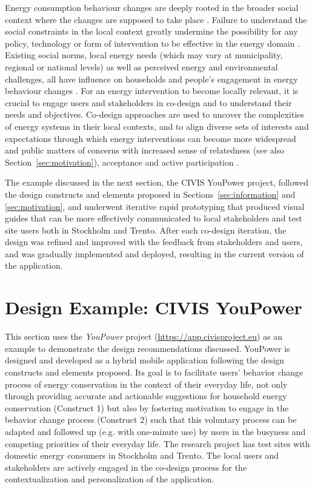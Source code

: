 \documentclass[a4paper,10pt]{article}
\begin{document}
Energy consumption behaviour changes are deeply rooted in the broader social context where the changes are supposed to take place \citep{Owens2008}. Failure to understand the social constraints in the local context greatly undermine the possibility for any policy, technology or form of intervention to be effective in the energy domain \citep{Devine-Wright2005}. Existing social norms, local energy needs (which may vary at municipality, regional or national levels) as well as perceived energy and environmental challenges, all have influence on households and people's engagement in energy behaviour changes \citep{+}. For an energy intervention to become locally relevant, it is crucial to engage users and stakeholders in co-design and to understand their needs and objectives. Co-design approaches are used to uncover the complexities of energy systems in their local contexts, and to align diverse sets of interests and expectations \citep{Tang2008,Dick2012} through which energy interventions can become more widespread and public matters of concerns \citep{DiSalvo2014} with increased sense of relatedness (see also Section~\ref{sec:motivation}), acceptance and active participation \citep{Throndsen2015,Marres2012,Brynjarsdottir2012,pierce2003state,schwartz2015people,edward2015review}. 

The example discussed in the next section, the CIVIS YouPower project, followed the design constructs and elements proposed in Sections~\ref{sec:information} and \ref{sec:motivation}, and underwent iterative rapid prototyping that produced visual guides that can be more effectively communicated to local stakeholders and test site users both in Stockholm and Trento. After each co-design iteration, the design was refined and improved with the feedback from stakeholders and users, and was gradually implemented and deployed, resulting in the current version of the application.


\section{Design Example: CIVIS YouPower} 
\label{sec:example}

This section uses the \textit{YouPower} project (\url{https://app.civisproject.eu}) as an example to demonstrate the design recommendations discussed. YouPower is designed and developed as a hybrid mobile application following the design constructs and elements proposed. Its goal is to facilitate users' behavior change process of energy conservation in the context of their everyday life, not only through providing accurate and actionable suggestions for household energy conservation (Construct 1) but also by fostering motivation to engage in the behavior change process (Construct 2) such that this voluntary process can be adapted and followed up (e.g. with one-minute use) by users in the busyness and competing priorities of their everyday life. The research project has test sites with domestic energy consumers in Stockholm and Trento. The local users and stakeholders are actively engaged in the co-design process for the contextualization and personalization of the application. 
\end{document}

